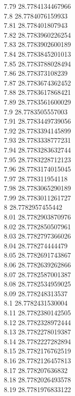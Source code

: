 {7.79	28.7784134467966\\
7.8	28.7784076159933\\
7.81	28.778401807943\\
7.82	28.7783960226254\\
7.83	28.7783902600189\\
7.84	28.7783845201013\\
7.85	28.7783788028494\\
7.86	28.778373108239\\
7.87	28.7783674362452\\
7.88	28.7783617868421\\
7.89	28.7783561600029\\
7.9	28.7783505557003\\
7.91	28.7783449739056\\
7.92	28.7783394145899\\
7.93	28.7783338777231\\
7.94	28.7783283632744\\
7.95	28.7783228712123\\
7.96	28.7783174015045\\
7.97	28.778311954118\\
7.98	28.7783065290189\\
7.99	28.7783011261727\\
8	28.7782957455442\\
8.01	28.7782903870976\\
8.02	28.7782850507961\\
8.03	28.7782797366026\\
8.04	28.778274444479\\
8.05	28.7782691743867\\
8.06	28.7782639262866\\
8.07	28.7782587001387\\
8.08	28.7782534959025\\
8.09	28.778248313537\\
8.1	28.7782431530004\\
8.11	28.7782380142505\\
8.12	28.7782328972444\\
8.13	28.7782278019387\\
8.14	28.7782227282894\\
8.15	28.7782176762519\\
8.16	28.7782126457813\\
8.17	28.778207636832\\
8.18	28.7782026493578\\
8.19	28.7781976833122\\
}
